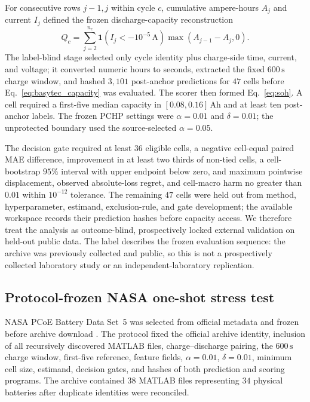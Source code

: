 \documentclass[11pt]{article}
\begin{document}
For consecutive rows $j-1,j$ within cycle $c$, cumulative ampere-hours $A_j$ and current $I_j$ defined the frozen discharge-capacity reconstruction
\begin{equation}
Q_c=\sum_{j=2}^{n_c}\mathbf{1}\!\left(I_j<-10^{-5}\,\mathrm{A}\right)
\max(A_{j-1}-A_j,0).
\label{eq:basytec_capacity}
\end{equation}
The label-blind stage selected only cycle identity plus charge-side time, current, and voltage; it converted numeric hours to seconds, extracted the fixed $600\,\mathrm{s}$ charge window, and hashed $3{,}101$ post-anchor predictions for $47$ cells before Eq.~\eqref{eq:basytec_capacity} was evaluated. The scorer then formed Eq.~\eqref{eq:soh}. A cell required a first-five median capacity in $[0.08,0.16]\,\mathrm{Ah}$ and at least ten post-anchor labels. The frozen PCHP settings were $\alpha=0.01$ and $\delta=0.01$; the unprotected boundary used the source-selected $\alpha=0.05$.

The decision gate required at least $36$ eligible cells, a negative cell-equal paired MAE difference, improvement in at least two thirds of non-tied cells, a cell-bootstrap $95\%$ interval with upper endpoint below zero, and maximum pointwise displacement, observed absolute-loss regret, and cell-macro harm no greater than $0.01$ within $10^{-12}$ tolerance. The remaining $47$ cells were held out from method, hyperparameter, estimand, exclusion-rule, and gate development; the available workspace records their prediction hashes before capacity access. We therefore treat the analysis as outcome-blind, prospectively locked external validation on held-out public data. The label describes the frozen evaluation sequence: the archive was previously collected and public, so this is not a prospectively collected laboratory study or an independent-laboratory replication.

\subsection{Protocol-frozen NASA one-shot stress test}

NASA PCoE Battery Data Set~5 was selected from official metadata and frozen before archive download \citep{saha2007nasa}. The protocol fixed the official archive identity, inclusion of all recursively discovered MATLAB files, charge--discharge pairing, the $600\,\mathrm{s}$ charge window, first-five reference, feature fields, $\alpha=0.01$, $\delta=0.01$, minimum cell size, estimand, decision gates, and hashes of both prediction and scoring programs. The archive contained $38$ MATLAB files representing $34$ physical batteries after duplicate identities were reconciled.
\end{document}

